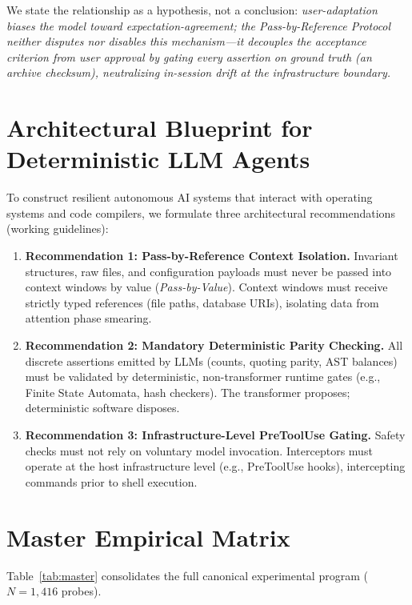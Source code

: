 \documentclass[11pt,a4paper]{article}
\begin{document}
We state the relationship as a hypothesis, not a conclusion: \emph{user-adaptation biases the model toward expectation-agreement; the Pass-by-Reference Protocol neither disputes nor disables this mechanism---it decouples the acceptance criterion from user approval by gating every assertion on ground truth (an archive checksum), neutralizing in-session drift at the infrastructure boundary.}

\section{Architectural Blueprint for Deterministic LLM Agents}
\label{sec:architecture}

To construct resilient autonomous AI systems that interact with operating systems and code compilers, we formulate three architectural recommendations (working guidelines):

\begin{enumerate}
    \item \textbf{Recommendation 1: Pass-by-Reference Context Isolation.} Invariant structures, raw files, and configuration payloads must never be passed into context windows by value (\textit{Pass-by-Value}). Context windows must receive strictly typed references (file paths, database URIs), isolating data from attention phase smearing.
    \item \textbf{Recommendation 2: Mandatory Deterministic Parity Checking.} All discrete assertions emitted by LLMs (counts, quoting parity, AST balances) must be validated by deterministic, non-transformer runtime gates (e.g., Finite State Automata, hash checkers). The transformer proposes; deterministic software disposes.
    \item \textbf{Recommendation 3: Infrastructure-Level PreToolUse Gating.} Safety checks must not rely on voluntary model invocation. Interceptors must operate at the host infrastructure level (e.g., PreToolUse hooks), intercepting commands prior to shell execution.
\end{enumerate}

\section{Master Empirical Matrix}

Table~\ref{tab:master} consolidates the full canonical experimental program ($N=1,416$ probes).
\end{document}

